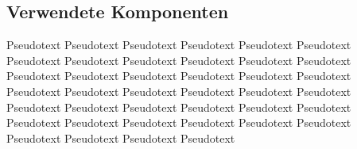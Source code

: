 \subsection{Verwendete Komponenten}
\label{kap:AnzugVerwendeteKomponenten}
Pseudotext Pseudotext Pseudotext Pseudotext Pseudotext Pseudotext Pseudotext Pseudotext Pseudotext Pseudotext Pseudotext Pseudotext Pseudotext Pseudotext Pseudotext Pseudotext Pseudotext Pseudotext Pseudotext Pseudotext Pseudotext Pseudotext Pseudotext Pseudotext Pseudotext Pseudotext Pseudotext Pseudotext Pseudotext Pseudotext Pseudotext Pseudotext Pseudotext Pseudotext Pseudotext Pseudotext Pseudotext Pseudotext Pseudotext Pseudotext 